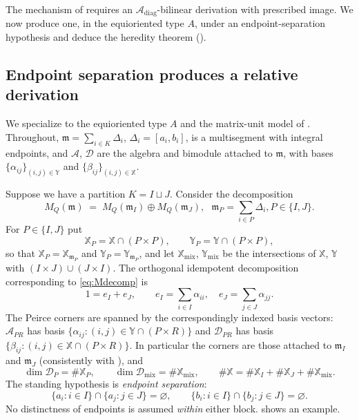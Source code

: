 \documentclass[12pt]{article}
\theoremstyle{definition}
\newcommand{\mix}{\mathrm{mix}}   %
\newcommand{\diag}{\mathrm{diag}} %
\newcommand{\mm}{\mathfrak{m}}
\newcommand{\alg}{\mathcal{A}}   %
\newcommand{\bmdl}{\mathcal{D}}   %
\newcommand{\XX}{\mathbb{X}}  %
\newcommand{\YY}{\mathbb{Y}}  %
\newcommand{\Kk}{K}         %
\newcommand{\algbss}{\alpha}     %
\newcommand{\bmdlbss}{\beta}    %
\begin{document}
The mechanism of  requires an
$\alg_{\diag}$-bilinear derivation with prescribed image. We now
produce one, in the equioriented type $A$, under an endpoint-separation hypothesis and deduce the heredity
theorem ().

\subsection{Endpoint separation produces a relative derivation}\label{ssec:typeAsep}

We specialize to the equioriented type $A$ and the matrix-unit model of
. Throughout, $\mm = \sum_{i \in \Kk}\Delta_i$, $\Delta_i =
[a_i,b_i]$, is a multisegment with integral endpoints, and
$\alg$, $\bmdl$ are the algebra and bimodule
attached to $\mm$, with bases $\{\algbss_{ij}\}_{(i,j)\in \YY}$ and
$\{\bmdlbss_{ij}\}_{(i,j)\in \XX}$.

Suppose we have a partition $\Kk = I \sqcup J$. Consider the decomposition 
\begin{equation} \label{eq:Mdecomp}
   M_Q(\mm) \;=\; M_Q(\mm_I)\oplus M_Q(\mm_J),\ \ \    \mm_P = \sum_{i \in P}\Delta_i, P\in\{I,J\}.
\end{equation}
For $P \in \{I,J\}$ put
\[
\XX_P = \XX \cap (P\times P), \qquad   \YY_P = \YY \cap (P\times P),
\]
so that $\XX_P = \XX_{\mm_P}$ and $\YY_P = \YY_{\mm_P}$, and let
$\XX_{\mix}$, $\YY_{\mix}$ be the intersections of $\XX$,
$\YY$ with $(I\times J)\cup(J\times I)$. The orthogonal idempotent
decomposition corresponding to \eqref{eq:Mdecomp} is
\[
   1 = e_I + e_J, \qquad   e_I = \sum_{i\in I}\algbss_{ii}, \quad e_J = \sum_{j\in J}\algbss_{jj} .
\]
The Peirce corners are spanned by the correspondingly indexed basis
vectors: $\alg_{PR}$ has basis $\{\algbss_{ij} : (i,j) \in \YY\cap(P\times
R)\}$ and $\bmdl_{PR}$ has basis $\{\bmdlbss_{ij} : (i,j) \in \XX\cap(P\times
R)\}$. In particular the corners are those attached to $\mm_I$ and
$\mm_J$ (consistently with ), and
\begin{equation}\label{eq:Xcount}
   \dim \bmdl_P = \#\XX_P, \qquad
   \dim \bmdl_{\mix} = \#\XX_{\mix}, \qquad
   \#\XX = \#\XX_I + \#\XX_J + \#\XX_{\mix} .
\end{equation}
The standing hypothesis is \emph{endpoint separation}:
\begin{equation}\label{eq:sep}
   \{a_i : i \in I\} \cap \{a_j : j \in J\} = \varnothing,
   \qquad
   \{b_i : i \in I\} \cap \{b_j : j \in J\} = \varnothing .
\end{equation}
No distinctness of endpoints is assumed \emph{within} either block.  shows an example.
\end{document}

